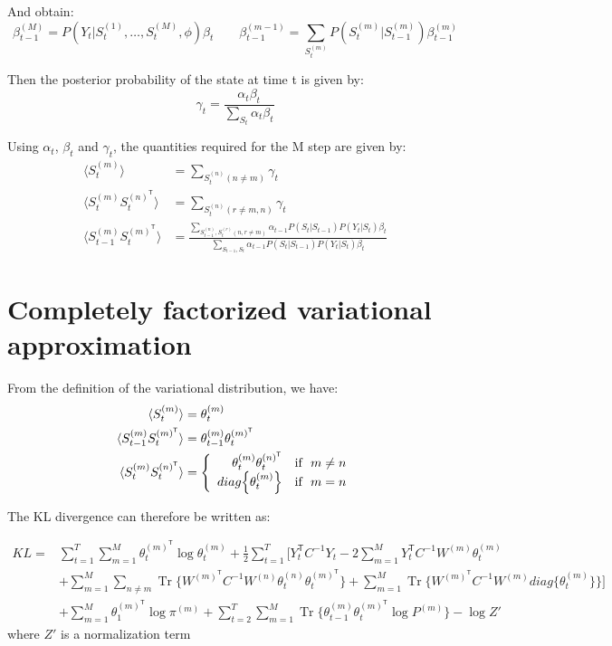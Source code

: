 \documentclass{article}
\DeclareMathOperator{\Tr}{Tr}
\begin{document}
And obtain:
\[ \beta_{t-1}^{(M)} = P(Y_t | S_t^{(1)},\dots,S_t^{(M)}, \phi) \beta_t \qquad \beta_{t-1}^{(m-1)} = \sum_{S_{t}^{(m)}} P(S_t^{(m)} | S_{t-1}^{(m)}) \beta_{t-1}^{(m)} \]

Then the posterior probability of the state at time t is given by:
\[ \gamma_t = \frac{\alpha_t \beta_t}{\sum_{S_t} \alpha_t \beta_t} \]

Using $\alpha_t$, $\beta_t$ and $\gamma_t$, the quantities required for the M step are given by:
\begin{align*}
\langle S_t^{(m)} \rangle &= \sum_{S_t^{(n)} (n \ne m)} \gamma_t \\
\langle S_t^{(m)} S_t^{(n)^\mathsf{T}} \rangle &= \sum_{S_t^{(n)} (r \ne m,n)} \gamma_t \\
\langle S_{t-1}^{(m)} S_t^{(m)^\mathsf{T}} \rangle &= \frac{\sum_{S_{t-1}^{(n)},S_t^{(r)} (n,r \ne m)} \alpha_{t-1} P(S_t | S_{t-1}) P(Y_t | S_t) \beta_t}{\sum_{S_{t-1},S_t} \alpha_{t-1} P(S_t | S_{t-1}) P(Y_t | S_t) \beta_t}
\end{align*}

\section{Completely factorized variational approximation}

From the definition of the variational distribution, we have:
\begin{align*}
\langle S_t^{(m)} \rangle &= \theta_t^{(m)} \\
\langle S_{t-1}^{(m)} S_t^{(m)^\mathsf{T}} \rangle &= \theta_{t-1}^{(m)} \theta_t^{(m)^\mathsf{T}} \\
\langle S_t^{(m)} S_t^{(n)^\mathsf{T}} \rangle &= \left\{
  \begin{array}{rcr}
    \theta_{t}^{(m)} \theta_t^{(n)^\mathsf{T}} \quad \textnormal{if} \ \ m \ne n \\
    diag\Big\{\theta_t^{(m)}\Big\} \quad \textnormal{if} \ \ m = n \\
  \end{array}
\right.
\end{align*}

The KL divergence can therefore be written as:

\begin{align*}
KL = &\sum_{t=1}^T \sum_{m=1}^M \theta_t^{(m)^\mathsf{T}} \log \theta_t^{(m)} + \frac{1}{2} \sum_{t=1}^T \Bigg[ Y_t^\mathsf{T} C^{-1} Y_t - 2 \sum_{m=1}^M Y_t^\mathsf{T} C^{-1} W^{(m)} \theta_t^{(m)} \\
&+ \sum_{m=1}^M \sum_{n \ne m} \Tr\bigg\{ W^{(m)^\mathsf{T}} C^{-1} W^{(n)} \theta_t^{(n)} \theta_t^{(m)^\mathsf{T}} \bigg\} + \sum_{m=1}^M \Tr\bigg\{ W^{(m)^\mathsf{T}} C^{-1} W^{(m)} diag\Big\{\theta_t^{(m)}\Big\} \bigg\} \Bigg] \\
&+ \sum_{m=1}^M \theta_1^{(m)^\mathsf{T}} \log \pi^{(m)} + \sum_{t=2}^T \sum_{m=1}^M \Tr\bigg\{ \theta_{t-1}^{(m)} \theta_t^{(m)^\mathsf{T}} \log P^{(m)} \bigg\} - \log Z'
\end{align*}
where $Z'$ is a normalization term
\end{document}
